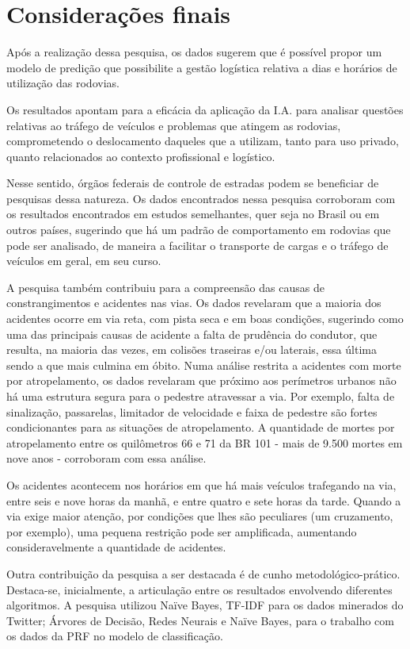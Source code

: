 \chapter{Considerações finais}\label{intro:resumen}

Após a realização dessa pesquisa, os dados sugerem que é possível propor um modelo de predição que possibilite a gestão logística relativa a dias e horários de utilização das rodovias.  

Os resultados apontam para a eficácia da aplicação da
I.A. para analisar questões relativas ao tráfego de veículos e problemas que atingem as rodovias, comprometendo o deslocamento daqueles que a utilizam, tanto para uso privado, quanto relacionados ao contexto profissional e logístico. 

Nesse sentido, órgãos federais de controle de estradas podem se beneficiar de pesquisas dessa natureza. 
Os dados encontrados nessa pesquisa corroboram com os resultados encontrados em estudos semelhantes, quer seja no Brasil ou em outros países, sugerindo que há um padrão de comportamento em rodovias que pode ser analisado, de maneira a facilitar o transporte de cargas e o tráfego de veículos em geral, em seu curso. 

A pesquisa também contribuiu para a compreensão das causas de constrangimentos e acidentes nas vias. Os dados revelaram que a maioria dos acidentes ocorre em via reta, com pista seca e em boas condições, sugerindo como uma das principais causas de acidente a falta de prudência do condutor, que resulta, na maioria das vezes, em colisões traseiras e/ou laterais, essa última sendo a que mais culmina em óbito. Numa análise restrita a acidentes com morte por atropelamento, os dados revelaram que próximo aos perímetros urbanos não há uma estrutura segura para o pedestre atravessar a via. Por exemplo, falta de sinalização, passarelas, limitador de velocidade e faixa de pedestre são fortes condicionantes para as situações de atropelamento. A quantidade de mortes por atropelamento entre os quilômetros 66 e 71 da BR 101 - mais de 9.500 mortes em nove anos - corroboram com essa análise.

Os acidentes acontecem nos horários em que há mais veículos trafegando na via, entre seis e nove horas da manhã, e entre quatro e sete horas da tarde. Quando a via exige maior atenção, por condições que lhes são peculiares (um cruzamento, por exemplo), uma pequena restrição pode ser amplificada, aumentando consideravelmente a quantidade de acidentes.

Outra contribuição da pesquisa a ser destacada é de cunho metodológico-prático. Destaca-se, inicialmente, a articulação entre os resultados envolvendo diferentes algoritmos. A pesquisa utilizou Naïve Bayes, TF-IDF para os dados minerados do Twitter; 
Árvores de Decisão, Redes Neurais e  Naïve Bayes, para o trabalho com os dados da PRF no modelo de classificação.  

